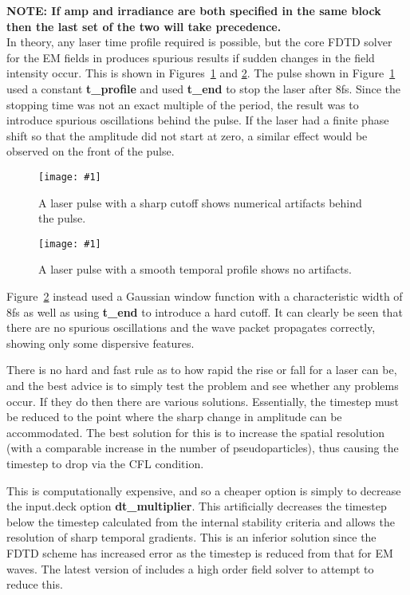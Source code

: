 \documentclass[12pt,a4paper]{article}
\newcommand{\emphtext}{\color{warwickdark} \fontfamily{phv}\selectfont\large\bf}
\newcommand{\inlineemph}[1]{{\color{warwicklight} \bf{#1}}}
\newcommand{\EPOCH}{{\color{warwickdark}\fontfamily{phv}\selectfont{EPOCH}}}
\newcommand{\captionedimage}[3]
  {{\begin{figure}[hbt!]\centering\texttt{[image: \#1]}\caption{#3}\label{#2}
    \end{figure}}}
\begin{document}
{\emphtext NOTE: If amp and irradiance are both specified in the same block
then the last set of the two will take precedence.}\\

In theory, any laser time profile required is possible, but the core FDTD
solver for the EM fields in {\EPOCH} produces spurious results if sudden
changes in the field intensity occur. This is shown in Figures~\ref{badpulse}
and \ref{smoothpulse}. The pulse shown in Figure~\ref{badpulse} used a constant
\inlineemph{t\_profile} and used \inlineemph{t\_end} to stop the laser after
8fs. Since the stopping time was not an exact multiple of the period, the
result was to introduce spurious oscillations behind the pulse. If the laser
had a finite phase shift so that the amplitude did not start at zero, a
similar effect would be observed on the front of the pulse.

\captionedimage{./images/pulse2}{badpulse}{A laser pulse with a sharp
  cutoff shows numerical artifacts behind the pulse.}
\captionedimage{./images/pulse1}{smoothpulse}{A laser pulse with a smooth
  temporal profile shows no artifacts.}

Figure~\ref{smoothpulse} instead used a Gaussian window function with a
characteristic width of 8fs as well as using \inlineemph{t\_end} to introduce
a hard cutoff. It can clearly be seen that there are no spurious oscillations
and the wave packet propagates correctly, showing only some dispersive
features.

There is no hard and fast rule as to how rapid the rise or fall for a laser can
be, and the best advice is to simply test the problem and see whether any
problems occur. If they do then there are various solutions. Essentially, the
timestep must be reduced to the point where the sharp change in amplitude can
be accommodated. The best solution for this is to increase the spatial
resolution (with a comparable increase in the number of pseudoparticles), thus
causing the timestep to drop via the CFL condition.

This is computationally expensive, and so a cheaper option is simply to
decrease the input.deck option \inlineemph{dt\_multiplier}. This artificially
decreases the timestep below the timestep calculated from the internal
stability criteria and allows the resolution of sharp temporal gradients. This
is an inferior solution since the FDTD scheme has increased error as the
timestep is reduced from that for EM waves. The latest version of {\EPOCH}
includes a high order field solver to attempt to reduce this.
\end{document}

